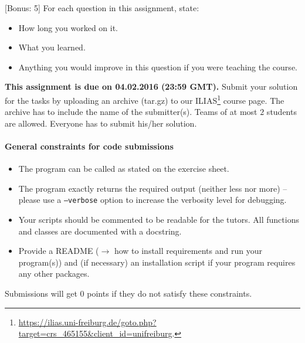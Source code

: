 \documentclass{exam}
\begin{document}
\begin{questions}
[Bonus: 5]
For each question in this assignment, state:
\begin{itemize}
	\item How long you worked on it.
	\item What you learned.
	\item Anything you would improve in this question if you were teaching the course.
\end{itemize}

\end{questions}




\noindent
{\bf This assignment is due on 04.02.2016 (23:59 GMT).} Submit your solution for the tasks by uploading an archive (tar.gz) to our ILIAS\footnote{ \url{https://ilias.uni-freiburg.de/goto.php?target=crs_465155&client_id=unifreiburg}.} course page. The archive has to include the name of the submitter(s). Teams of at most $2$ students are allowed. Everyone has to submit his/her solution. 

\bigskip
\paragraph{General constraints for code submissions}

\begin{itemize}
  \item The program can be called as stated on the exercise sheet.
  \item The program exactly returns the required output (neither less nor more) -- please use a \texttt{--verbose} option to increase the verbosity level for debugging.
  \item Your scripts should be commented to be readable for the tutors. All functions and classes are documented with a docstring. 
  \item Provide a README ($\to$ how to install requirements and run your program(s)) and (if necessary) an installation script if your program requires any other packages.
\end{itemize}

\bigskip

Submissions will get $0$ points if they do not satisfy these constraints.
\end{document}
